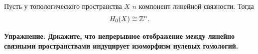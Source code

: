     \begin{corollary}
        Пусть у топологического пространства $X$ $n$ компонент линейной связности. Тогда
        \[ H_{0}(X) \cong \mathbb{Z}^{n}. \]
    \end{corollary}

    \noindent\bf{Упражнение.}
    Дркажите, что непрерывное отображение между линейно связными пространствами индуцирует изоморфизм нулевых гомологий.


    






    

    

    


